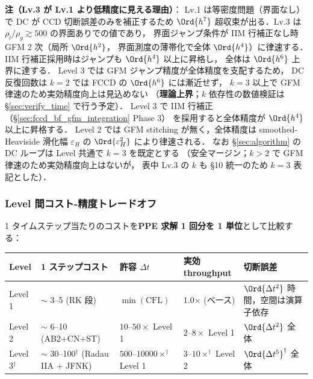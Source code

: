 \noindent\textbf{注（Lv.3 が Lv.1 より低精度に見える理由）}：
Lv.1 は等密度問題（界面なし）で DC が CCD 切断誤差のみを補正するため
$\Ord{h^7}$ 超収束が出る．Lv.3 は $\rho_l/\rho_g\gtrsim 500$ の界面ありでの値であり，
界面ジャンプ条件が IIM 行補正なし時 GFM 2 次（局所 $\Ord{h^2}$，
界面測度の薄帯化で全体 $\Ord{h^4}$）に律速する．
IIM 行補正採用時はジャンプも $\Ord{h^4}$ 以上に昇格し，
全体は $\Ord{h^6}$ 上界に達する．
Level 3 では GFM ジャンプ精度が全体精度を支配するため，
DC 反復回数は $k=2$ では FCCD の $\Ord{h^6}$ には漸近せず，
$k=3$ 以上で GFM 律速のため実効精度向上は見込めない
（\textbf{理論上界}；$k$ 依存性の数値検証は
\S\ref{sec:verify_time} で行う予定）．
Level 3 で IIM 行補正（\S\ref{sec:fccd_bf_gfm_integration} Phase 3）
を採用すると全体精度が $\Ord{h^4}$ 以上に昇格する．
Level 2 では GFM stitching が無く，全体精度は smoothed-Heaviside 滑化幅
$\varepsilon_H$ の $\Ord{\varepsilon_H^2}$ により律速される．
なお \S\ref{sec:algorithm} の DC ループは Level 共通で $k=3$ を既定とする
（安全マージン；$k>2$ で GFM 律速のため実効精度向上はないが，
表中 Lv.3 の $k$ も §10 統一のため $k=3$ 表記とした）．

\subsubsection{Level 間コスト-精度トレードオフ}
\label{sec:level_cost_accuracy}

1 タイムステップ当たりのコストを\textbf{PPE 求解 1 回分を 1 単位}として比較する：

\begin{center}
\footnotesize
\begin{tabular}{@{}p{1.2cm}p{3.1cm}p{2.4cm}p{2.5cm}p{3.4cm}@{}}
\hline
Level & 1 ステップコスト & 許容 $\Delta t$ & 実効 throughput & 切断誤差 \\
\hline
Level 1 & $\sim$ 3--5 (RK 段) &
  $\min(\text{CFL})$ & 1.0× (ベース) &
  $\Ord{\Delta t^2}$ 時間，空間は演算子依存 \\
Level 2 & $\sim$ 6--10 (AB2+CN+ST) &
  $10$--$50\times$ Level 1 & $2$--$8\times$ Level 1 &
  $\Ord{\Delta t^2}$ 全体 \\
Level 3$^{\dagger}$ & $\sim$ 30--100$^{\dagger}$ (Radau IIA + JFNK) &
  $500$--$10000\times^{\dagger}$ Level 1 & $3$--$10\times^{\dagger}$ Level 2 &
  $\Ord{\Delta t^5}^{\dagger}$ 全体 \\
\hline
\end{tabular}
\end{center}

